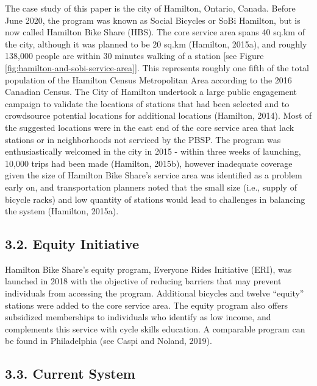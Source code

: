 \documentclass[]{elsarticle} %
\begin{document}
The case study of this paper is the city of Hamilton, Ontario, Canada.
Before June 2020, the program was known as Social Bicycles or SoBi
Hamilton, but is now called Hamilton Bike Share (HBS). The core service
area spans 40 sq.km of the city, although it was planned to be 20 sq.km
(Hamilton, 2015a), and roughly 138,000 people are within 30 minutes
walking of a station {[}see Figure
\ref{fig:hamilton-and-sobi-service-area}{]}. This represents roughly one
fifth of the total population of the Hamilton Census Metropolitan Area
according to the 2016 Canadian Census. The City of Hamilton undertook a
large public engagement campaign to validate the locations of stations
that had been selected and to crowdsource potential locations for
additional locations (Hamilton, 2014). Most of the suggested locations
were in the east end of the core service area that lack stations or in
neighborhoods not serviced by the PBSP. The program was enthusiastically
welcomed in the city in 2015 - within three weeks of launching, 10,000
trips had been made (Hamilton, 2015b), however inadequate coverage given
the size of Hamilton Bike Share's service area was identified as a
problem early on, and transportation planners noted that the small size
(i.e., supply of bicycle racks) and low quantity of stations would lead
to challenges in balancing the system (Hamilton, 2015a).

\hypertarget{equity-initiative}{%
\subsection{3.2. Equity Initiative}\label{equity-initiative}}

Hamilton Bike Share's equity program, Everyone Rides Initiative (ERI),
was launched in 2018 with the objective of reducing barriers that may
prevent individuals from accessing the program. Additional bicycles and
twelve ``equity'' stations were added to the core service area. The
equity program also offers subsidized memberships to individuals who
identify as low income, and complements this service with cycle skills
education. A comparable program can be found in Philadelphia (see Caspi
and Noland, 2019).

\hypertarget{current-system}{%
\subsection{3.3. Current System}\label{current-system}}
\end{document}
